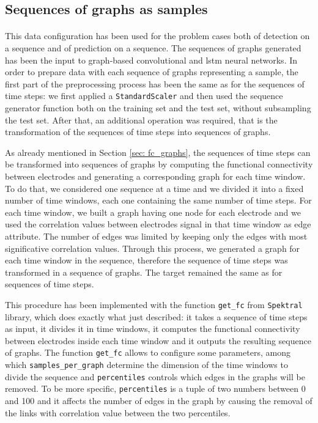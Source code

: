 \subsection{Sequences of graphs as samples}
\paragraph{} This data configuration has been used for the problem cases both of detection on a sequence and of prediction on a sequence. The sequences of graphs generated has been the input to graph-based convolutional and 
\acs{lstm} neural networks. In order to prepare data with each sequence of graphs representing a sample, the first part of the preprocessing process has been the same as for the sequences of time steps: we first applied a \texttt{StandardScaler} and then used the sequence generator function both on the training set and the test set, without subsampling the test set. After that, an additional operation was required, that is the transformation of the sequences of time steps into sequences of graphs.

As already mentioned in Section \ref{sec: fc_graphs}, the sequences of time steps can be transformed into sequences of graphs by computing the functional connectivity between electrodes and generating a corresponding graph for each time window. To do that, we considered one sequence at a time and we divided it into a fixed number of time windows, each one containing the same number of time steps. For each time window, we built a graph having one node for each electrode and we used the correlation values between electrodes signal in that time window as edge attribute. The number of edges was limited by keeping only the edges with most significative correlation values. Through this process, we generated a graph for each time window in the sequence, therefore the sequence of time steps was transformed in a sequence of graphs. The target remained the same as for sequences of time steps.

This procedure has been implemented with the function \texttt{get\_fc} from \texttt{Spektral} library, which does exactly what just described: it takes a sequence of time steps as input, it divides it in time windows, it computes the functional connectivity between electrodes inside each time window and it outputs the resulting sequence of graphs. The function \texttt{get\_fc} allows to configure some parameters, among which \texttt{samples\_per\_graph} determine the dimension of the time windows to divide the sequence and \texttt{percentiles} controls which edges in the graphs will be removed. To be more specific, \texttt{percentiles} is a tuple of two numbers between 0 and 100 and it affects the number of edges in the graph by causing the removal of the links with correlation value between the two percentiles.

